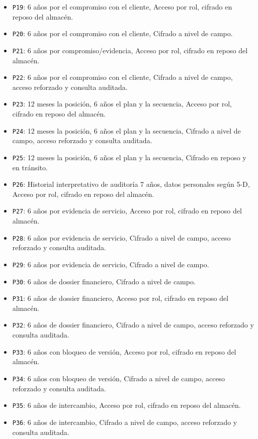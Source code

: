 \begin{itemize}
\item \texttt{P19}: 6 años por el compromiso con el cliente, Acceso por rol, cifrado en reposo del almacén.
\item \texttt{P20}: 6 años por el compromiso con el cliente, Cifrado a nivel de campo.
\item \texttt{P21}: 6 años por compromiso/evidencia, Acceso por rol, cifrado en reposo del almacén.
\item \texttt{P22}: 6 años por el compromiso con el cliente, Cifrado a nivel de campo, acceso reforzado y consulta auditada.
\item \texttt{P23}: 12 meses la posición, 6 años el plan y la secuencia, Acceso por rol, cifrado en reposo del almacén.
\item \texttt{P24}: 12 meses la posición, 6 años el plan y la secuencia, Cifrado a nivel de campo, acceso reforzado y consulta auditada.
\item \texttt{P25}: 12 meses la posición, 6 años el plan y la secuencia, Cifrado en reposo y en tránsito.
\item \texttt{P26}: Historial interpretativo de auditoría 7 años, datos personales según 5-D, Acceso por rol, cifrado en reposo del almacén.
\item \texttt{P27}: 6 años por evidencia de servicio, Acceso por rol, cifrado en reposo del almacén.
\item \texttt{P28}: 6 años por evidencia de servicio, Cifrado a nivel de campo, acceso reforzado y consulta auditada.
\item \texttt{P29}: 6 años por evidencia de servicio, Cifrado a nivel de campo.
\item \texttt{P30}: 6 años de dossier financiero, Cifrado a nivel de campo.
\item \texttt{P31}: 6 años de dossier financiero, Acceso por rol, cifrado en reposo del almacén.
\item \texttt{P32}: 6 años de dossier financiero, Cifrado a nivel de campo, acceso reforzado y consulta auditada.
\item \texttt{P33}: 6 años con bloqueo de versión, Acceso por rol, cifrado en reposo del almacén.
\item \texttt{P34}: 6 años con bloqueo de versión, Cifrado a nivel de campo, acceso reforzado y consulta auditada.
\item \texttt{P35}: 6 años de intercambio, Acceso por rol, cifrado en reposo del almacén.
\item \texttt{P36}: 6 años de intercambio, Cifrado a nivel de campo, acceso reforzado y consulta auditada.

\end{itemize}
